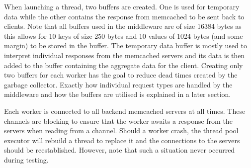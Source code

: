 \documentclass[11pt,a4paper]{article}
\begin{document}
When launching a thread, two buffers are created. One is used for temporary data while the other contains the response from memcached to be sent back to clients. Note that all buffers used in the middleware are of size 16384 bytes as this allows for 10 keys of size 250 bytes and 10 values of 1024 bytes (and some margin) to be stored in the buffer. The temporary data buffer is mostly used to interpret individual responses from the memcached servers and its data is then added to the buffer containing the aggregate data for the client. Creating only two buffers for each worker has the goal to reduce dead times created by the garbage collector. Exactly how individual request types are handled by the middleware and how the buffers are utilised is explained in a later section.

Each worker is connected to all backend memcached servers at all times. These channels are blocking to ensure that the worker awaits a response from the servers when reading from a channel. Should a worker crash, the thread pool executor will rebuild a thread to replace it and the connections to the servers should be reestablished. However, note that such a situation never occurred during testing.
\end{document}
